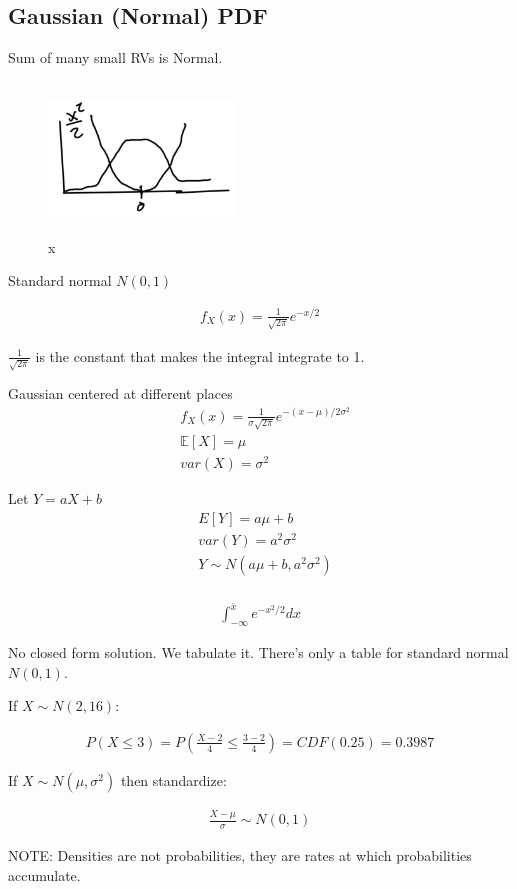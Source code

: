 \subsection{Gaussian (Normal) PDF}


Sum of many small RVs is Normal.

\begin{figure}[h]
\centering
\includegraphics[width=5cm, height=4cm]{images/L08/gaussian_pdf.jpeg}
\caption{x}
\end{figure}

Standard normal $N(0,1)$

\begin{align*}
f_X(x) = \frac{1}{\sqrt{2\pi}} e^{-x/2}
\end{align*}

$\frac{1}{\sqrt{2\pi}}$ is the constant that makes the integral integrate to 1.

Gaussian centered at different places
\begin{align*}
&f_X(x) = \frac{1}{\sigma\sqrt{2\pi}} e^{-(x-\mu)/2\sigma^2}\\
&\mathbb{E}[X]=\mu \\
&var(X)= \sigma^2
\end{align*}

Let $Y=aX+b$
\begin{align*}
&E[Y]=a\mu+b\\
&var(Y)= a^2 \sigma^2\\
&Y \sim N(a\mu+b, a^2 \sigma^2)\\
\end{align*}


\begin{align*}
\int_{-\infty}^{\bar{x}} e^{-x^2/2}dx
\end{align*}

No closed form solution.  We tabulate it.  There's only a table for standard normal $N(0,1)$.

If $X \sim N(2,16)$:

\begin{align*}
P(X \le 3) = P\left( \frac{X-2}{4} \le \frac{3-2}{4} \right) = CDF(0.25)=0.3987
\end{align*}

If $X \sim N(\mu,\sigma^2)$ then standardize:

\begin{align*}
\frac{X- \mu}{\sigma} \sim N(0,1)
\end{align*}

NOTE: Densities are not probabilities, they are rates at which probabilities accumulate.
